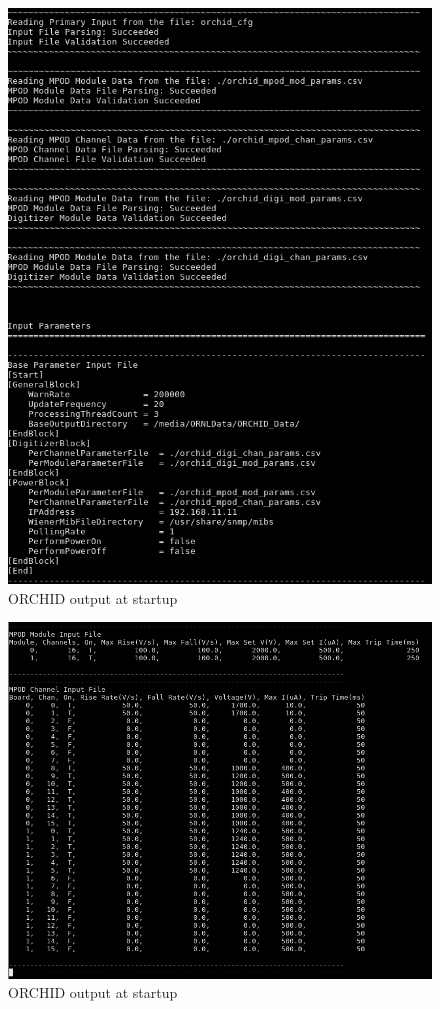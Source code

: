 \documentclass[onecolumn, 10pt, letterpaper, twoside]{article}
\begin{document}
\begin{figure}[h!]
\begin{center}
\includegraphics[width=\textwidth]{./img/Start_Screen_2.png}
\caption{ORCHID output at startup}
\label{fig:ORCHID_Startup2}
\end{center}
\end{figure}
\begin{figure}[h!]
\begin{center}
\includegraphics[width=\textwidth]{./img/Start_Screen_3.png}
\caption{ORCHID output at startup}
\label{fig:ORCHID_Startup3}
\end{center}
\end{figure}
\end{document}
